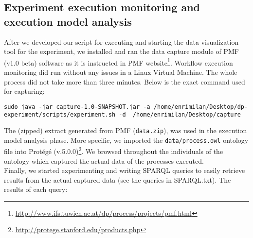 \documentclass[12pt, a4paper]{article}
\begin{document}
\subsection{Experiment execution monitoring and execution model analysis}
After we developed our script for executing and starting the data visualization tool for the experiment, we installed and ran the data capture module of PMF (v1.0 beta) software as it is instructed in PMF website\footnote{\url{http://www.ifs.tuwien.ac.at/dp/process/projects/pmf.html}}. Workflow execution monitoring did run without any issues in a Linux Virtual Machine. The whole process did not take more than three minutes. Below is the exact command used for capturing:
\begin{lstlisting}[breaklines]
sudo java -jar capture-1.0-SNAPSHOT.jar -a /home/enrimilan/Desktop/dp-experiment/scripts/experiment.sh -d  /home/enrimilan/Desktop/capture
\end{lstlisting}
The (zipped) extract generated from PMF (\verb|data.zip|), was used in the execution model analysis phase. More specific, we imported the \verb|data/process.owl|  ontology file into Protégé (v.5.0.0)\footnote{\url{http://protege.stanford.edu/products.php}}.  We browsed throughout the individuals of the ontology which captured the actual data of the processes executed.\\
Finally, we started experimenting and writing SPARQL queries to easily retrieve results from the actual captured data (see the queries in SPARQL.txt). The results of each query:
\end{document}
